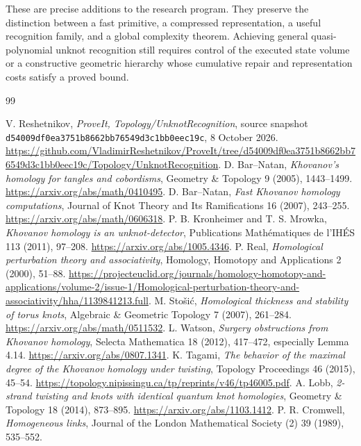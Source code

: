 \documentclass[11pt]{article}
\theoremstyle{definition}
\theoremstyle{remark}
\newcommand{\code}[1]{\texttt{#1}}
\begin{document}
These are precise additions to the research program. They preserve the distinction between a fast primitive, a compressed representation, a useful recognition family, and a global complexity theorem. Achieving general quasi-polynomial unknot recognition still requires control of the executed state volume or a constructive geometric hierarchy whose cumulative repair and representation costs satisfy a proved bound.

\clearpage
\begingroup
\small
\begin{thebibliography}{99}
\raggedright
{} V. Reshetnikov, \emph{ProveIt, Topology/UnknotRecognition}, source snapshot \code{d54009df0ea3751b8662bb76549d3c1bb0eec19c}, 8 October 2026. \url{https://github.com/VladimirReshetnikov/ProveIt/tree/d54009df0ea3751b8662bb76549d3c1bb0eec19c/Topology/UnknotRecognition}.
 D. Bar--Natan, \emph{Khovanov's homology for tangles and cobordisms}, Geometry \& Topology 9 (2005), 1443--1499. \url{https://arxiv.org/abs/math/0410495}.
 D. Bar--Natan, \emph{Fast Khovanov homology computations}, Journal of Knot Theory and Its Ramifications 16 (2007), 243--255. \url{https://arxiv.org/abs/math/0606318}.
 P. B. Kronheimer and T. S. Mrowka, \emph{Khovanov homology is an unknot-detector}, Publications Math\'ematiques de l'IH\'ES 113 (2011), 97--208. \url{https://arxiv.org/abs/1005.4346}.
 P. Real, \emph{Homological perturbation theory and associativity}, Homology, Homotopy and Applications 2 (2000), 51--88. \url{https://projecteuclid.org/journals/homology-homotopy-and-applications/volume-2/issue-1/Homological-perturbation-theory-and-associativity/hha/1139841213.full}.
 M. Sto\v{s}i\'c, \emph{Homological thickness and stability of torus knots}, Algebraic \& Geometric Topology 7 (2007), 261--284. \url{https://arxiv.org/abs/math/0511532}.
 L. Watson, \emph{Surgery obstructions from Khovanov homology}, Selecta Mathematica 18 (2012), 417--472, especially Lemma 4.14. \url{https://arxiv.org/abs/0807.1341}.
 K. Tagami, \emph{The behavior of the maximal degree of the Khovanov homology under twisting}, Topology Proceedings 46 (2015), 45--54. \url{https://topology.nipissingu.ca/tp/reprints/v46/tp46005.pdf}.
 A. Lobb, \emph{2-strand twisting and knots with identical quantum knot homologies}, Geometry \& Topology 18 (2014), 873--895. \url{https://arxiv.org/abs/1103.1412}.
 P. R. Cromwell, \emph{Homogeneous links}, Journal of the London Mathematical Society (2) 39 (1989), 535--552.

\end{thebibliography}
\end{document}
